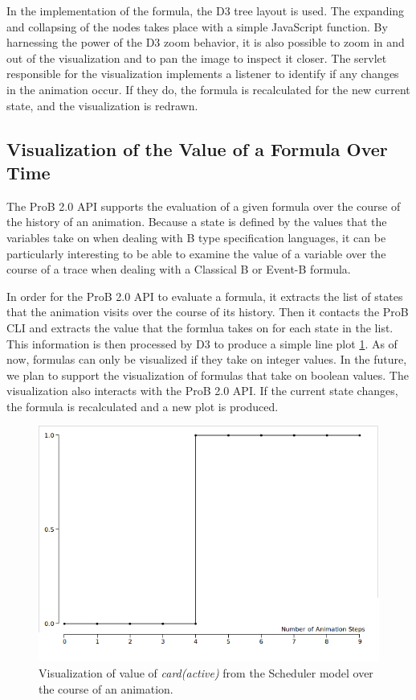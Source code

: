 In the implementation of the formula, the D3 tree layout is used. The expanding and collapsing of the nodes takes place with a simple JavaScript function. By harnessing the power of the D3 zoom behavior, it is also possible to zoom in and out of the visualization and to pan the image to inspect it closer. The servlet responsible for the visualization implements a listener to identify if any changes in the animation occur. If they do, the formula is recalculated for the new current state, and the visualization is redrawn.

\subsection{Visualization of the Value of a Formula Over Time}

The ProB 2.0 API supports the evaluation of a given formula over the course of the history of an animation.
Because a state is defined by the values that the variables take on when dealing with B type specification languages, it can be particularly interesting to be able to examine the value of a variable over the course of a trace when dealing with a Classical B or Event-B formula. 

In order for the ProB 2.0 API to evaluate a formula, it extracts the list of states that the animation visits over the course of its history. Then it contacts the ProB CLI and extracts the value that the formlua takes on for each state in the list. This information is then processed by D3 to produce a simple line plot \ref{timeVsValue}. As of now, formulas can only be visualized if they take on integer values. In the future, we plan to support the visualization of formulas that take on boolean values. The visualization also interacts with the ProB 2.0 API. If the current state changes, the formula is recalculated and a new plot is produced.

\begin{figure}[h!]
\centering
\includegraphics[width=15cm]{bilder/timeVsValue.png}
\caption{Visualization of value of \emph{card(active)} from the Scheduler model over the course of an animation.}
\label{timeVsValue}
\end{figure}

